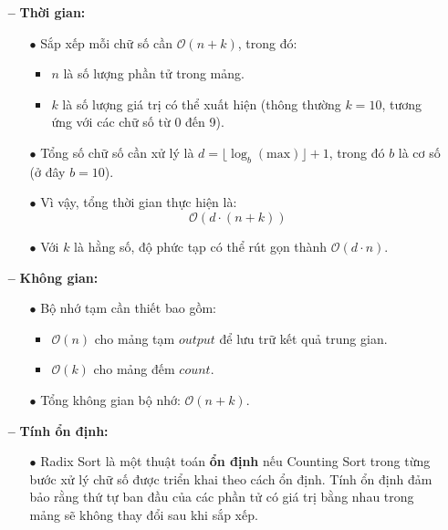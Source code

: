 \begin{itemize}
    \item[\textbf{--}] \textbf{Thời gian:}
    \begin{itemize}
        \item[$\bullet$] Sắp xếp mỗi chữ số cần \(\mathcal{O}(n + k)\), trong đó:
        \begin{itemize}
            \item \(n\) là số lượng phần tử trong mảng.
            \item \(k\) là số lượng giá trị có thể xuất hiện (thông thường \(k = 10\), tương ứng với các chữ số từ 0 đến 9).
        \end{itemize}
        \item[$\bullet$] Tổng số chữ số cần xử lý là \(d = \lfloor \log_b(\text{max}) \rfloor + 1\), trong đó \(b\) là cơ số (ở đây \(b = 10\)).
        \item[$\bullet$] Vì vậy, tổng thời gian thực hiện là:
        \[
        \mathcal{O}(d \cdot (n + k))
        \]
        \item[$\bullet$] Với \(k\) là hằng số, độ phức tạp có thể rút gọn thành \(\mathcal{O}(d \cdot n)\).
    \end{itemize}
    \item[\textbf{--}] \textbf{Không gian:}
    \begin{itemize}
        \item[$\bullet$] Bộ nhớ tạm cần thiết bao gồm:
        \begin{itemize}
            \item \(\mathcal{O}(n)\) cho mảng tạm \(output\) để lưu trữ kết quả trung gian.
            \item \(\mathcal{O}(k)\) cho mảng đếm \(count\).
        \end{itemize}
        \item[$\bullet$] Tổng không gian bộ nhớ: \(\mathcal{O}(n + k)\).
    \end{itemize}
    \item[\textbf{--}] \textbf{Tính ổn định:}
    \begin{itemize}
        \item[$\bullet$] Radix Sort là một thuật toán \textbf{ổn định} nếu Counting Sort trong từng bước xử lý chữ số được triển khai theo cách ổn định. Tính ổn định đảm bảo rằng thứ tự ban đầu của các phần tử có giá trị bằng nhau trong mảng sẽ không thay đổi sau khi sắp xếp.
    \end{itemize}
\end{itemize}